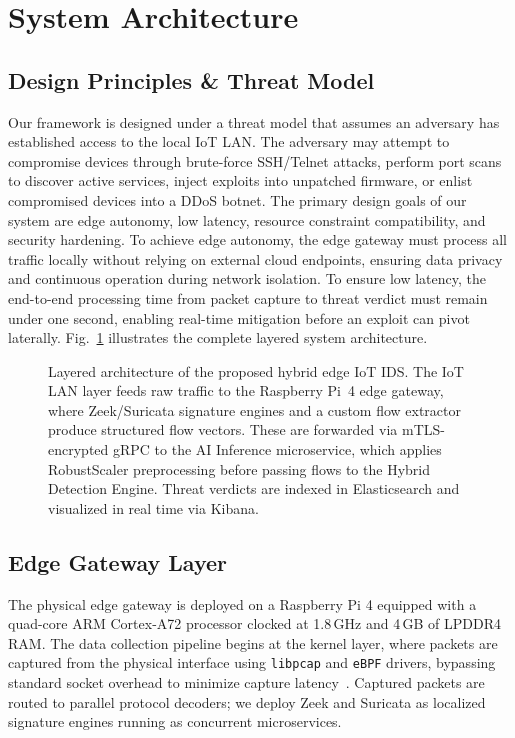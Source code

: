 \documentclass[journal]{IEEEtran}
\begin{document}
\section{System Architecture}

\subsection{Design Principles & Threat Model}
Our framework is designed under a threat model that assumes an adversary has established access to the local IoT LAN. The adversary may attempt to compromise devices through brute-force SSH/Telnet attacks, perform port scans to discover active services, inject exploits into unpatched firmware, or enlist compromised devices into a DDoS botnet. The primary design goals of our system are edge autonomy, low latency, resource constraint compatibility, and security hardening. To achieve edge autonomy, the edge gateway must process all traffic locally without relying on external cloud endpoints, ensuring data privacy and continuous operation during network isolation. To ensure low latency, the end-to-end processing time from packet capture to threat verdict must remain under one second, enabling real-time mitigation before an exploit can pivot laterally. Fig.~\ref{fig:architecture} illustrates the complete layered system architecture.

\begin{figure}[t]
  \centering
  \caption{Layered architecture of the proposed hybrid edge IoT IDS.
    The IoT LAN layer feeds raw traffic to the Raspberry Pi~4 edge
    gateway, where Zeek/Suricata signature engines and a custom flow
    extractor produce structured flow vectors. These are forwarded
    via mTLS-encrypted gRPC to the AI Inference microservice, which
    applies RobustScaler preprocessing before passing flows to the
    Hybrid Detection Engine. Threat verdicts are indexed in
    Elasticsearch and visualized in real time via Kibana.}
  \label{fig:architecture}
\end{figure}

\subsection{Edge Gateway Layer}

The physical edge gateway is deployed on a Raspberry Pi 4
equipped with a quad-core ARM Cortex-A72 processor clocked
at 1.8\,GHz and 4\,GB of LPDDR4 RAM. The data collection
pipeline begins at the kernel layer, where packets are captured
from the physical interface using \texttt{libpcap} and \texttt{eBPF}
drivers, bypassing standard socket overhead to minimize capture
latency~\cite{vieira2020using}. Captured packets are routed to
parallel protocol decoders; we deploy Zeek and Suricata as
localized signature engines running as concurrent microservices.
\end{document}
